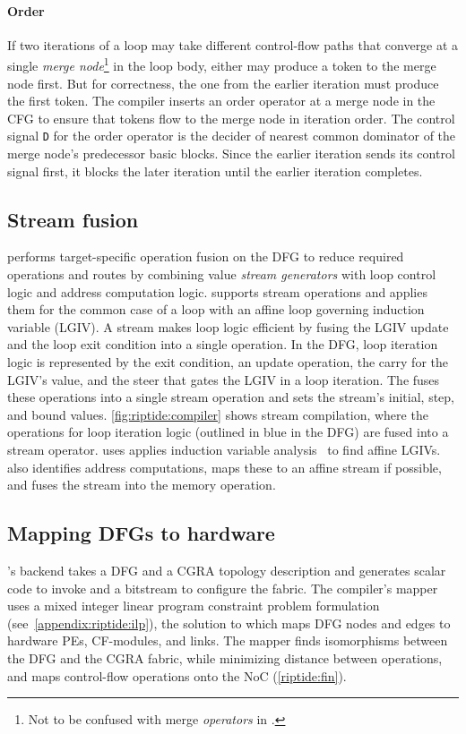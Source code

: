\paragraph{Order}
If two iterations of a loop may take different control-flow
paths that converge at a single {\em merge node}\footnote{Not to be confused with merge \emph{operators} in \riptide.} in the loop body, either may
produce a token to the merge node first.
But for correctness, the one from the
earlier iteration must produce the first token.
%
The compiler inserts an order operator at a merge node in the CFG to ensure that 
tokens flow to the merge node in iteration order.
%
The control signal {\tt D} for the order operator is the decider of
nearest common dominator of the merge node's predecessor basic blocks.
%
%
Since the earlier iteration sends its control signal first, it blocks the later
iteration %
until the earlier iteration completes.
%

\subsection{Stream fusion}

\riptidecomp performs target-specific operation fusion on the DFG to
reduce required operations and routes by combining value {\em stream generators} with loop
control logic and address computation logic.
%
\riptide supports stream operations and applies them for the common case 
of a loop with an affine loop governing induction variable (LGIV).
%
A stream makes loop logic efficient by fusing the LGIV update and the loop
exit condition into a single operation.
%
In the DFG, loop iteration logic is represented by the exit condition, an
update operation, the carry for the LGIV's value, and the steer that
gates the LGIV in a loop iteration.
%
The \mend fuses these operations into a single stream operation and sets
the stream's initial, step, and bound values.
%
\autoref{fig:riptide:compiler} shows stream compilation, where
the operations for loop iteration logic (outlined in blue in the 
DFG) are fused into a stream operator.
%
\riptidecomp uses applies induction variable analysis~\cite{dragon,zima-scev} to 
find affine LGIVs.
%
\riptidecomp also identifies address computations, maps these to an affine
stream if possible, and fuses the stream into the memory operation.
%

\subsection{Mapping DFGs to hardware}
\riptidecomp's backend takes a DFG and a CGRA topology description and generates
scalar code to invoke \riptide and a bitstream to configure the \riptide fabric.
% 
The compiler's mapper uses a mixed integer linear program constraint problem formulation (see~\autoref{appendix:riptide:ilp}), the
solution to which maps DFG nodes and edges to hardware PEs, CF-modules, and
links.
% 
The mapper finds isomorphisms between the DFG and the CGRA fabric, while
minimizing distance between operations, and maps control-flow operations onto
the NoC (\autoref{riptide:fin}).
%